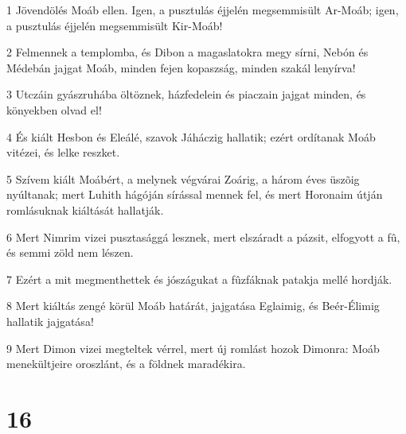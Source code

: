 \par 1 Jövendölés Moáb ellen. Igen, a pusztulás éjjelén megsemmisült Ar-Moáb; igen, a pusztulás éjjelén megsemmisült Kir-Moáb!
\par 2 Felmennek a templomba, és Dibon a magaslatokra megy sírni, Nebón és Médebán jajgat Moáb, minden fejen kopaszság, minden szakál lenyírva!
\par 3 Utczáin gyászruhába öltöznek, házfedelein és piaczain jajgat minden, és könyekben olvad el!
\par 4 És kiált Hesbon és Eleálé, szavok Jáháczig hallatik; ezért ordítanak Moáb vitézei, és lelke reszket.
\par 5 Szívem kiált Moábért, a melynek végvárai Zoárig, a három éves üszõig nyúltanak; mert Luhith hágóján sírással mennek fel, és mert Horonaim útján romlásuknak kiáltását hallatják.
\par 6 Mert Nimrim vizei pusztasággá lesznek, mert elszáradt a pázsit, elfogyott a fû, és semmi zöld nem lészen.
\par 7 Ezért a mit megmenthettek és jószágukat a fûzfáknak patakja mellé hordják.
\par 8 Mert kiáltás zengé körül Moáb határát, jajgatása Eglaimig, és Beér-Élimig hallatik jajgatása!
\par 9 Mert Dimon vizei megteltek vérrel, mert új romlást hozok Dimonra: Moáb menekültjeire oroszlánt, és a földnek maradékira.

\chapter{16}

